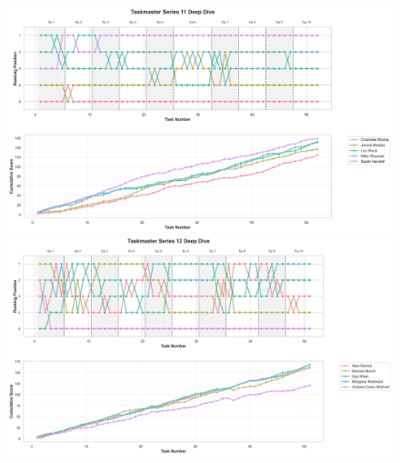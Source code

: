 \documentclass[10pt,letterpaper]{article}
\begin{document}
\begin{figure}[!h]
\centering
\includegraphics[width=\linewidth]{figures/supplementary/series_11_deep_dive.png}
\includegraphics[width=\linewidth]{figures/supplementary/series_12_deep_dive.png}
\end{figure}
\FloatBarrier
\clearpage
\end{document}
